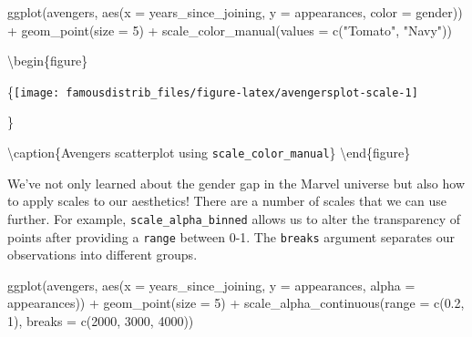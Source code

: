 \documentclass[
]{article}
\newenvironment{Shaded}{\begin{snugshade}}{\end{snugshade}}
\newcommand{\AttributeTok}[1]{\textcolor[rgb]{0.77,0.63,0.00}{#1}}
\newcommand{\DecValTok}[1]{\textcolor[rgb]{0.00,0.00,0.81}{#1}}
\newcommand{\FloatTok}[1]{\textcolor[rgb]{0.00,0.00,0.81}{#1}}
\newcommand{\FunctionTok}[1]{\textcolor[rgb]{0.00,0.00,0.00}{#1}}
\newcommand{\NormalTok}[1]{#1}
\newcommand{\SpecialCharTok}[1]{\textcolor[rgb]{0.00,0.00,0.00}{#1}}
\newcommand{\StringTok}[1]{\textcolor[rgb]{0.31,0.60,0.02}{#1}}
\begin{document}
\begin{Shaded}
\begin{Highlighting}[]
\FunctionTok{ggplot}\NormalTok{(avengers, }\FunctionTok{aes}\NormalTok{(}\AttributeTok{x =}\NormalTok{ years\_since\_joining,}
                     \AttributeTok{y =}\NormalTok{ appearances,}
                     \AttributeTok{color =}\NormalTok{ gender)) }\SpecialCharTok{+}
  \FunctionTok{geom\_point}\NormalTok{(}\AttributeTok{size =} \DecValTok{5}\NormalTok{) }\SpecialCharTok{+}
  \FunctionTok{scale\_color\_manual}\NormalTok{(}\AttributeTok{values =} \FunctionTok{c}\NormalTok{(}\StringTok{"Tomato"}\NormalTok{, }\StringTok{"Navy"}\NormalTok{))}
\end{Highlighting}
\end{Shaded}

\textbackslash begin\{figure\}

\{\centering \texttt{[image: famousdistrib\_files/figure-latex/avengersplot-scale-1]}

\}

\textbackslash caption\{Avengers scatterplot using \texttt{scale\_color\_manual}\}\label{fig:avengersplot-scale}
\textbackslash end\{figure\}

We've not only learned about the gender gap in the Marvel universe but also how to apply scales to our aesthetics! There are a number of scales that we can use further. For example, \texttt{scale\_alpha\_binned} allows us to alter the transparency of points after providing a \texttt{range} between 0-1. The \texttt{breaks} argument separates our observations into different groups.

\begin{Shaded}
\begin{Highlighting}[]
\FunctionTok{ggplot}\NormalTok{(avengers, }\FunctionTok{aes}\NormalTok{(}\AttributeTok{x =}\NormalTok{ years\_since\_joining,}
                     \AttributeTok{y =}\NormalTok{ appearances,}
                     \AttributeTok{alpha =}\NormalTok{ appearances)) }\SpecialCharTok{+}
  \FunctionTok{geom\_point}\NormalTok{(}\AttributeTok{size =} \DecValTok{5}\NormalTok{) }\SpecialCharTok{+}
  \FunctionTok{scale\_alpha\_continuous}\NormalTok{(}\AttributeTok{range =} \FunctionTok{c}\NormalTok{(}\FloatTok{0.2}\NormalTok{, }\DecValTok{1}\NormalTok{),}
                         \AttributeTok{breaks =} \FunctionTok{c}\NormalTok{(}\DecValTok{2000}\NormalTok{, }\DecValTok{3000}\NormalTok{, }\DecValTok{4000}\NormalTok{))}
\end{Highlighting}
\end{Shaded}
\end{document}
